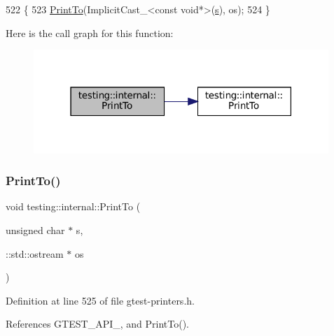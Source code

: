 \begin{DoxyCode}
522                                                             \{
523   \hyperlink{namespacetesting_1_1internal_af2c33928facbf2edf7af564278724d98}{PrintTo}(ImplicitCast\_<const void*>(\hyperlink{namespaceservice__node__3_aa976421a49e0b54f23833423400849ae}{s}), os);
524 \}
\end{DoxyCode}
Here is the call graph for this function\+:
\nopagebreak
\begin{figure}[H]
\begin{center}
\leavevmode
\includegraphics[width=316pt]{namespacetesting_1_1internal_a42c591f2164ad105b502a9262333aed2_cgraph}
\end{center}
\end{figure}
\mbox{\label{namespacetesting_1_1internal_a7fae797c500d66d0f5a9db4f205e3416}} 
\subsubsection{\texorpdfstring{Print\+To()}{PrintTo()}\hspace{0.1cm}{\footnotesize\ttfamily [15/20]}}
{\footnotesize\ttfamily void testing\+::internal\+::\+Print\+To (\begin{DoxyParamCaption}\item[{unsigned char $\ast$}]{s,  }\item[{\+::std\+::ostream $\ast$}]{os }\end{DoxyParamCaption})\hspace{0.3cm}{\ttfamily [inline]}}



Definition at line 525 of file gtest-\/printers.\+h.



References G\+T\+E\+S\+T\+\_\+\+A\+P\+I\+\_\+, and Print\+To().


